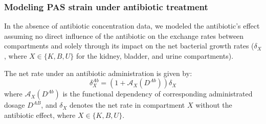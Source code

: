 \documentclass{article}
\begin{document}












\subsubsection{Modeling PAS strain under antibiotic treatment}


In the absence of antibiotic concentration data, we modeled the antibiotic's effect assuming no direct influence of the antibiotic on the exchange rates between compartments and solely through its impact on the net bacterial growth rates ($\delta_{X}$, where $X \in \{K,B,U\}$ for the kidney, bladder, and urine compartments). 

The net rate under an antibiotic administration is given by: 
\begin{equation}
\delta_{X}^{Ab} = \left( 1 + \mathcal{A}_{X}(D^{Ab}) \right) \delta_{X}
\label{eq:deltaAntibiotic}
\end{equation}
where $\mathcal{A}_{X}(D^{Ab})$ is the functional dependency of corresponding administrated dosage $D^{AB}$, and $\delta_X$ denotes the net rate in compartment $X$ without the antibiotic effect, where $X \in \{K, B, U\}$.
\end{document}
